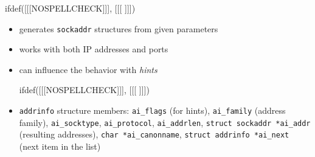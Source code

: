 
ifdef([[[NOSPELLCHECK]]], [[[
]]])


\begin{slide}

\begin{itemize}
\item generates \texttt{sockaddr} structures from given parameters
\item works with both IP addresses and ports
\item can influence the behavior with \emph{hints}

ifdef([[[NOSPELLCHECK]]], [[[
]]])
\item \texttt{addrinfo} structure members:
\texttt{ai\_flags} (for hints), \texttt{ai\_family} (address family),
\texttt{ai\_socktype}, \texttt{ai\_protocol}, \texttt{ai\_addrlen},
\texttt{struct sockaddr *ai\_addr} (resulting addresses),
\texttt{char *ai\_canonname},
\texttt{struct addrinfo *ai\_next} (next item in the list)
\end{itemize}
\end{slide}

